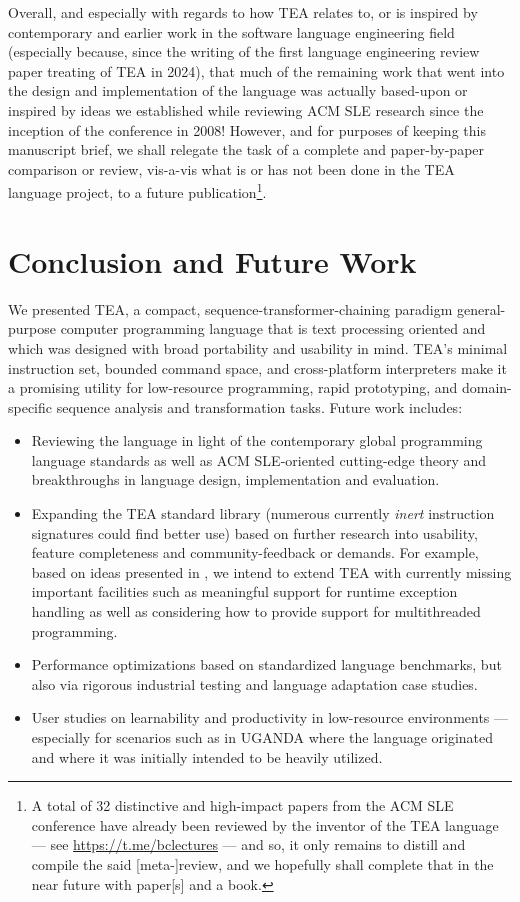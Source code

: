 \documentclass[acmtoplas]{acmart}
\begin{document}
Overall, and especially with regards to how TEA relates to, or is inspired by contemporary and earlier work in the software language engineering field (especially because, since the writing of the first language engineering review paper treating of TEA \cite{lutalo2024software} in 2024), that much of the remaining work that went into the design and implementation of the language was actually based-upon or inspired by ideas we established while reviewing ACM SLE research since the inception of the conference in 2008! However, and for purposes of keeping this manuscript brief, we shall relegate the task of a complete and paper-by-paper comparison or review, vis-a-vis what is or has not been done in the TEA language project, to a future publication\footnote{A total of 32 distinctive and high-impact papers from the ACM SLE conference have already been reviewed by the inventor of the TEA language --- see \url{https://t.me/bclectures} --- and so, it only remains to distill and compile the said [meta-]review, and we hopefully shall complete that in the near future with paper[s] and a book.}.



\section{Conclusion and Future Work}
\label{SEC10}

We presented TEA, a compact, sequence-transformer-chaining paradigm general-purpose computer programming language that is text processing oriented and which was designed with broad portability and usability in mind. TEA's minimal instruction set, bounded command space, and cross-platform interpreters make it a promising utility for low-resource programming, rapid prototyping, and domain-specific sequence analysis and transformation tasks. Future work includes:
\begin{itemize}
  \item Reviewing the language in light of the contemporary global programming language standards as well as ACM SLE-oriented cutting-edge theory and breakthroughs in language design, implementation and evaluation. 
  \item Expanding the TEA standard library (numerous currently \textit{inert} instruction signatures could find better use) based on further research into usability, feature completeness and community-feedback or demands. For example, based on ideas presented in \cite{zaytsev2020worstnightmare}, we intend to extend TEA with currently missing important facilities such as meaningful support for runtime exception handling as well as considering how to provide support for multithreaded programming. 
  \item Performance optimizations based on standardized language benchmarks, but also via rigorous industrial testing and language adaptation case studies.
  \item User studies on learnability and productivity in low-resource environments --- especially for scenarios such as in UGANDA where the language originated and where it was initially intended to be heavily utilized.
\end{itemize}
\end{document}
